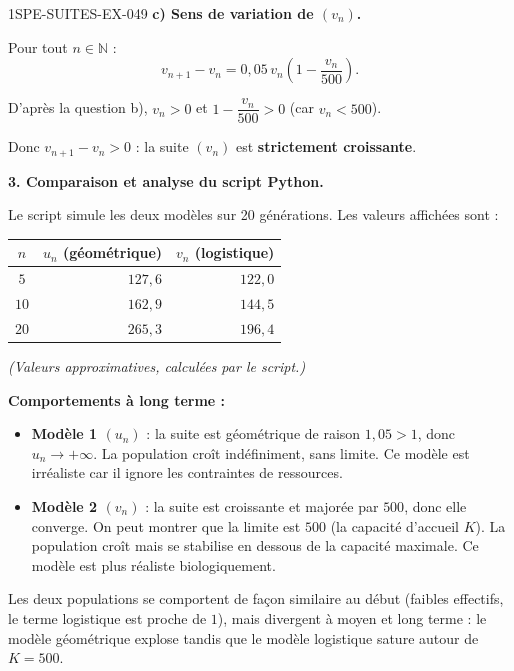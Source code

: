 \begin{corrige}{1SPE-SUITES-EX-049}
\textbf{c) Sens de variation de $(v_n)$.}

Pour tout $n \in \mathbb{N}$ :
\[
v_{n+1} - v_n = 0{,}05\,v_n\left(1 - \frac{v_n}{500}\right).
\]

D'après la question b), $v_n > 0$ et $1 - \dfrac{v_n}{500} > 0$ (car $v_n < 500$).

Donc $v_{n+1} - v_n > 0$ : la suite $(v_n)$ est \textbf{strictement croissante}.

\textbf{3. Comparaison et analyse du script Python.}

Le script simule les deux modèles sur 20 générations. Les valeurs affichées sont :

\begin{center}
\begin{tabular}{|c|r|r|}
\hline
$n$ & $u_n$ (géométrique) & $v_n$ (logistique) \\
\hline
$5$  & $127{,}6$ & $122{,}0$ \\
$10$ & $162{,}9$ & $144{,}5$ \\
$20$ & $265{,}3$ & $196{,}4$ \\
\hline
\end{tabular}
\end{center}

\textit{(Valeurs approximatives, calculées par le script.)}

\textbf{Comportements à long terme :}

\begin{itemize}
  \item \textbf{Modèle 1 $(u_n)$} : la suite est géométrique de raison $1{,}05 > 1$, donc $u_n \to +\infty$. La population croît indéfiniment, sans limite. Ce modèle est irréaliste car il ignore les contraintes de ressources.

  \item \textbf{Modèle 2 $(v_n)$} : la suite est croissante et majorée par $500$, donc elle converge. On peut montrer que la limite est $500$ (la capacité d'accueil $K$). La population croît mais se stabilise en dessous de la capacité maximale. Ce modèle est plus réaliste biologiquement.
\end{itemize}


Les deux populations se comportent de façon similaire au début (faibles effectifs, le terme logistique est proche de $1$), mais divergent à moyen et long terme : le modèle géométrique explose tandis que le modèle logistique sature autour de $K = 500$.

\end{corrige}
